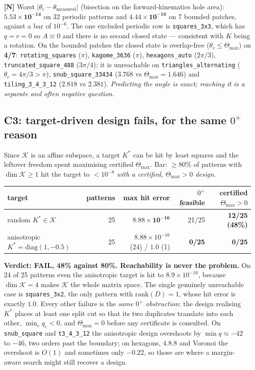 \documentclass[11pt,a4paper]{article}
\theoremstyle{definition}
\newcommand{\Tmax}{\Theta_{\max}}
\newcommand{\file}[1]{\texttt{\small #1}}
\begin{document}
\textbf{[N]} Worst $|\theta_c-\theta_{\mathrm{measured}}|$ (bisection on the forward-kinematics
hole area): $\mathbf{5.53\times10^{-14}}$ on 32 periodic patterns and
$\mathbf{4.44\times10^{-16}}$ on 7 bounded patches, against a bar of $10^{-6}$. The one
excluded periodic row is \file{squares\_3x3}, which has $q=r=0$ so $A\equiv0$ and there is no
second closed state --- consistent with $K$ being a rotation. On the bounded patches the
closed state is overlap-free ($\theta_c\le\Tmax$) on \textbf{4/7}: \file{rotating\_squares}
($\pi$), \file{kagome\_3636} ($\pi$), \file{hexagons\_auto} ($2\pi/3$),
\file{truncated\_square\_488} ($3\pi/4$); it is unreachable on
\file{triangles\_alternating} ($\theta_c=4\pi/3>\pi$), \file{snub\_square\_33434}
($3.768$ vs $\Tmax=1.646$) and \file{tiling\_3\_4\_3\_12} ($2.818$ vs $2.381$).
\emph{Predicting the angle is exact; reaching it is a separate and often negative question.}

\subsection{C3: target-driven design fails, for the same \texorpdfstring{$0^+$}{0+} reason}

Since $\mathcal{K}$ is an affine subspace, a target $K^*$ can be hit by least squares and the
leftover freedom spent maximising certified $\Tmax$. Bar: $\ge80\%$ of patterns with
$\dim\mathcal{K}\ge1$ hit the target to $<10^{-8}$ \emph{with a certified, $\Tmax>0$ design}.

\begin{center}
\small
\begin{tabular}{@{}lrrrr@{}}
\toprule
target & patterns & max hit error & $0^+$ feasible & \textbf{certified $\Tmax>0$} \\
\midrule
random $K^*\in\mathcal{K}$ & 25 & $\mathbf{8.88\times10^{-16}}$ & 21/25 & \textbf{12/25 (48\%)} \\
anisotropic $K^*=\mathrm{diag}(1,-0.5)$ & 25 & $8.88\times10^{-16}$ (24) / $1.0$ (1) & \textbf{0/25} & \textbf{0/25} \\
\bottomrule
\end{tabular}
\end{center}

\noindent \textbf{Verdict: FAIL, 48\% against 80\%. Reachability is never the problem.} On 24
of 25 patterns even the anisotropic target is hit to $8.9\times10^{-16}$, because
$\dim\mathcal{K}=4$ makes $\mathcal{K}$ the whole matrix space. The single genuinely
unreachable case is \file{squares\_3x2}, the only pattern with $\mathrm{rank}(D)=1$, whose hit
error is exactly $1.0$. Every other failure is the \emph{same $0^+$ obstruction}: the design
realising $K^*$ places at least one split cut so that its two duplicates translate into each
other, $\min_e q_e<0$, and $\Tmax=0$ before any certificate is consulted. On
\file{snub\_square} and \file{t3\_4\_3\_12} the anisotropic design overshoots by
$\min q\approx-42$ to $-46$, two orders past the boundary; on hexagons, 4.8.8 and Voronoi the
overshoot is $O(1)$ and sometimes only $-0.22$, so those are where a margin-aware search might
still recover a design.
\end{document}
